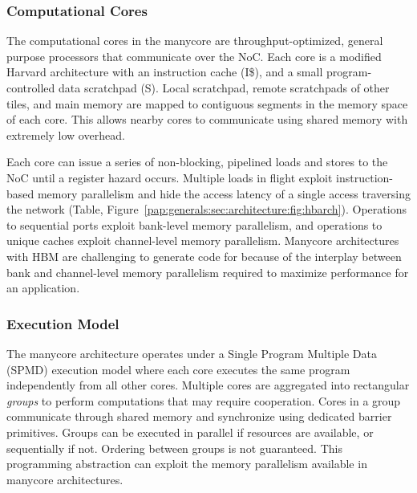 \subsubsection{Computational Cores}
The computational cores in
the manycore are
throughput-optimized, general purpose processors that communicate  over the NoC.
Each core is a modified Harvard architecture with an
instruction cache (I\$), and a small program-controlled data scratchpad
(S). Local scratchpad, remote scratchpads of other tiles, and main
memory are mapped to contiguous segments in the memory
space of each core. This allows nearby cores to communicate
using shared memory with extremely low overhead. 

Each core can issue a series of non-blocking, pipelined loads and stores to the NoC until a register hazard occurs. Multiple loads in flight exploit
instruction-based memory parallelism and hide the access latency of a
single access traversing the network (Table,
Figure~\ref{pap:generals:sec:architecture:fig:hbarch}). Operations
to sequential ports exploit bank-level memory parallelism, and
operations to unique caches exploit channel-level memory
parallelism. 
Manycore architectures with HBM are challenging to generate code for because of the interplay between bank and channel-level memory parallelism required to maximize performance for an application.


\subsubsection{Execution Model}
The manycore architecture operates under a Single Program Multiple
Data (SPMD) execution model where each core executes the same program
independently from all other cores. Multiple cores are aggregated into
rectangular \textit{groups} to perform computations that may require
cooperation. Cores in a group communicate through shared memory and
synchronize using dedicated barrier primitives. Groups can be executed
in parallel if resources are available, or sequentially if not. Ordering
between groups is not guaranteed. This programming abstraction can 
exploit the memory parallelism available in manycore architectures.

